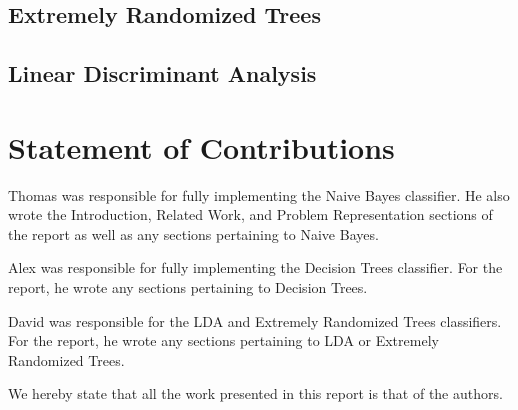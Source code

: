 \documentclass[conference]{IEEEtran}
\begin{document}
\subsection{Extremely Randomized Trees}
\subsection{Linear Discriminant Analysis} %


\section{Statement of Contributions}
Thomas was responsible for fully implementing the Naive Bayes classifier. He also wrote the Introduction, Related Work, and Problem Representation sections of the report as well as any sections pertaining to Naive Bayes.

Alex was responsible for fully implementing the Decision Trees classifier. For the report, he wrote any sections pertaining to Decision Trees.

David was responsible for the LDA and Extremely Randomized Trees classifiers. For the report, he wrote any sections pertaining to LDA or Extremely Randomized Trees.

We hereby state that all the work presented in this report is that of the authors.





%
%
\end{document}

